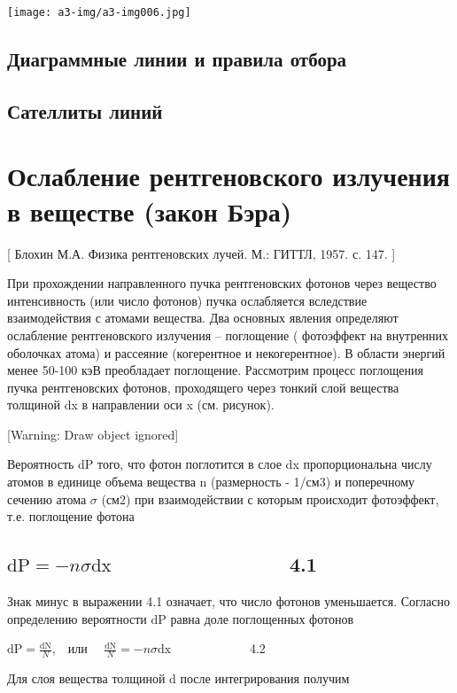 \documentclass[a4paper,14pt, openany, twoside, draft]{extbook} %
\begin{document}
 \texttt{[image: a3-img/a3-img006.jpg]}


\section{Диаграммные линии и правила отбора}
\label{sec:diag-lines}

\section{Сателлиты линий}
\label{sec:sattelit-lines}

\chapter{Ослабление рентгеновского излучения в веществе (закон Бэра)}
\label{cha:}
 [ Блохин М.А. Физика рентгеновских лучей. М.: ГИТТЛ, 1957. с. 147. ]

При прохождении направленного пучка рентгеновских фотонов через вещество интенсивность (или число фотонов) пучка ослабляется вследствие взаимодействия с атомами вещества. Два основных явления определяют ослабление рентгеновского излучения – поглощение ( фотоэффект на внутренних оболочках атома) и рассеяние (когерентное и некогерентное). В области энергий менее 50-100 кэВ преобладает поглощение. Рассмотрим процесс поглощения пучка рентгеновских фотонов, проходящего через тонкий слой вещества толщиной dx в направлении оси x (см. рисунок).

[Warning: Draw object ignored]

Вероятность dP того, что фотон поглотится в слое dx пропорциональна числу атомов в единице объема вещества n (размерность - 1/см3) и поперечному сечению атома  $\sigma $ (см2) при взаимодействии с которым происходит фотоэффект, т.е. поглощение фотона

\section[\ \ \ \ \ \ \ \ \ \ \ \ \ \ \ \ 4.1]{ $\text{dP}=-\mathit{n\sigma }\text{dx}$ \ \ \ \ \ \ \ \ \ \ \ \ \ \ \ \ 4.1}
Знак минус в выражении 4.1 означает, что число фотонов уменьшается. Согласно определению вероятности  $\text{dP}$ равна доле поглощенных фотонов

 $\text{dP}=\frac{\text{dN}} N$,\ \ или \ \  $\frac{\text{dN}} N=-\mathit{n\sigma }\text{dx}$ \ \ \ \ \ \ \ \ \ \ \ \ 4.2

Для слоя вещества толщиной d  после интегрирования получим \ \ \ \
\end{document}

